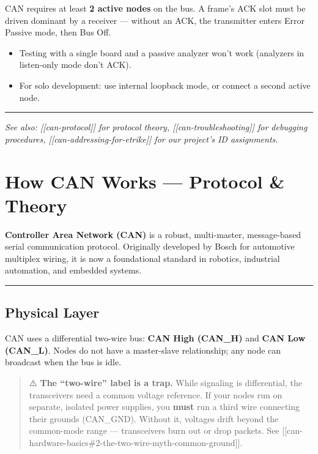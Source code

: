 \documentclass[12pt,a4paper,oneside]{report}
\providecommand{\tightlist}{\setlength{\itemsep}{0pt}\setlength{\parskip}{0pt}}
\begin{document}
CAN requires at least \textbf{2 active nodes} on the bus. A frame's ACK slot
must be driven dominant by a receiver --- without an ACK, the transmitter enters
Error Passive mode, then Bus Off.

\begin{itemize}
\tightlist
\item
  Testing with a single board and a passive analyzer won't work (analyzers in
  listen-only mode don't ACK).
\item
  For solo development: use internal loopback mode, or connect a second active
  node.
\end{itemize}

\begin{center}\rule{0.5\linewidth}{0.5pt}\end{center}

\emph{See also: {[}{[}can-protocol{]}{]} for protocol theory,
{[}{[}can-troubleshooting{]}{]} for debugging procedures,
{[}{[}can-addressing-for-etrike{]}{]} for our project's ID assignments.}


\chapter{How CAN Works --- Protocol \&
Theory}\label{how-can-works-protocol-theory}

\textbf{Controller Area Network (CAN)} is a robust, multi-master, message-based
serial communication protocol. Originally developed by Bosch for automotive
multiplex wiring, it is now a foundational standard in robotics, industrial
automation, and embedded systems.

\begin{center}\rule{0.5\linewidth}{0.5pt}\end{center}

\section{Physical Layer}\label{physical-layer}

CAN uses a differential two-wire bus: \textbf{CAN High (CAN\_H)} and \textbf{CAN
Low (CAN\_L)}. Nodes do not have a master-slave relationship; any node can
broadcast when the bus is idle.

\begin{quote}
⚠️ \textbf{The ``two-wire'' label is a trap.} While signaling is differential,
the transceivers need a common voltage reference. If your nodes run on separate,
isolated power supplies, you \textbf{must} run a third wire connecting their
grounds (CAN\_GND). Without it, voltages drift beyond the common-mode range ---
transceivers burn out or drop packets. See
{[}{[}can-hardware-basics\#2-the-two-wire-myth-common-ground{]}{]}.
\end{quote}
\end{document}
